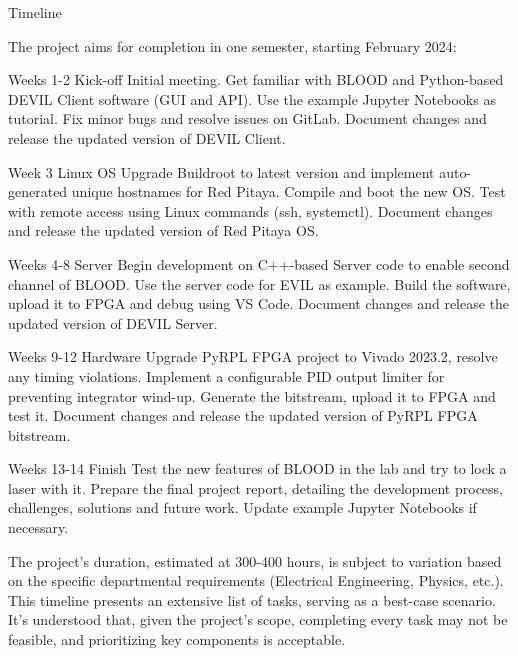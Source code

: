 \documentclass{project-proposal}
\begin{document}
\begin{sectiontimeline}{Timeline}

    The project aims for completion in one semester, starting February 2024:

    \timelineentry
    {Weeks 1-2}
    {Kick-off}
    {
        Initial meeting. Get familiar with BLOOD and Python-based DEVIL Client software
        (GUI and API). Use the example Jupyter Notebooks as tutorial. Fix minor bugs
        and resolve issues on GitLab. Document changes and release the updated version
        of DEVIL Client.
    }

    \timelineentryspacer

    \timelineentry
    {Week 3}
    {Linux OS}
    {
        Upgrade Buildroot to latest version and implement auto-generated unique
        hostnames for Red Pitaya. Compile and boot the new OS. Test with remote
        access using Linux commands (ssh, systemctl). Document changes and release the
        updated version of Red Pitaya OS.
    }

    \timelineentryspacer

    \timelineentry
    {Weeks 4-8}
    {Server}
    {
        Begin development on C++-based Server code to enable second channel of BLOOD.
        Use the server code for EVIL as example. Build the software, upload it to FPGA
        and debug using VS Code. Document changes and release the updated version of
        DEVIL Server.
    }

    \newpage

    \timelineentry
    {Weeks 9-12}
    {Hardware}
    {
        Upgrade PyRPL FPGA project to Vivado 2023.2, resolve any timing violations.
        Implement a configurable PID output limiter for preventing integrator wind-up.
        Generate the bitstream, upload it to FPGA and test it. Document changes and
        release the updated version of PyRPL FPGA bitstream.
    }

    \timelineentryspacer

    \timelineentry
    {Weeks 13-14}
    {Finish}
    {
        Test the new features of BLOOD in the lab and try to lock a laser with it.
        Prepare the final project report, detailing the development process, challenges,
        solutions and future work. Update example Jupyter Notebooks if necessary.
    }

    The project's duration, estimated at 300-400 hours, is subject to variation based
    on the specific departmental requirements (Electrical Engineering, Physics, etc.).
    This timeline presents an extensive list of tasks, serving as a best-case scenario.
    It's understood that, given the project's scope, completing every task may not be
    feasible, and prioritizing key components is acceptable.

\end{sectiontimeline}
\end{document}
